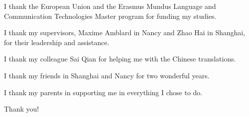 
\begin{thanks}

  I thank the European Union and the Erasmus Mundus Language and Communication
  Technologies Master program for funding my studies.

  I thank my supervisors, Maxime Amblard in Nancy and Zhao Hai in Shanghai,
  for their leadership and assistance.

  I thank my colleague Sai Qian for helping me with the Chinese translations.

  I thank my friends in Shanghai and Nancy for two wonderful years.

  I thank my parents in supporting me in everything I chose to do.

  Thank you!

\end{thanks}
